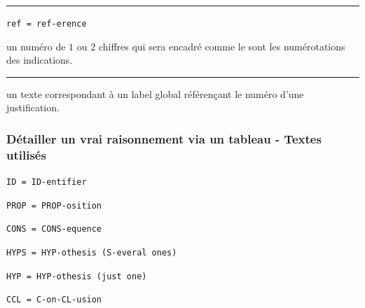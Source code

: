 \documentclass[12pt,a4paper]{article}
\theoremstyle{definition}
\newcommand\separation{
	\medskip
	\hfill\rule{0.5\textwidth}{0.75pt}\hfill
	\medskip
}
\newcommand\extraspace{
	\vspace{0.25em}
}
\newcommand\mwhyprefix[2]{%
	\texttt{#1 = #1-#2}%
}
\newcommand\prefix[1]{%
	\texttt{#1}%
}
\begin{document}
\separation


  \hfill \mwhyprefix{ref}{erence}

\IDarg{} un numéro de $1$ ou $2$ chiffres qui sera encadré comme le sont les numérotations des indications.


\separation



\IDarg{} un texte correspondant à un label global référençant le numéro d'une justification.


\subsubsection{Détailler un \og vrai \fg{} raisonnement via un tableau - Textes utilisés}

     \hfill \mwhyprefix{ID}{entifier}


   \hfill \mwhyprefix{PROP}{osition}

   \hfill \mwhyprefix{CONS}{equence}

\extraspace

   \hfill \prefix{HYPS = HYP-othesis (S-everal ones)} 

    \hfill \prefix{HYP = HYP-othesis (just one)}

    \hfill \prefix{CCL = C-on-CL-usion}

\extraspace

\end{document}
